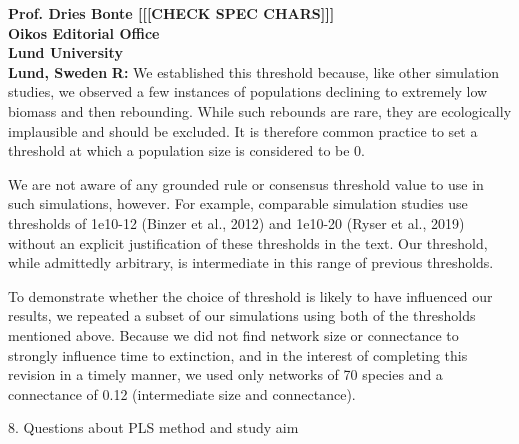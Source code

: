 \documentclass[12pt]{letter}
\begin{document}
\begin{letter}{\bf Prof. Dries Bonte [[[CHECK SPEC CHARS]]]\\
Oikos Editorial Office \\
Lund University \\
Lund, Sweden}
      \textbf{R:} We established this threshold because, like other simulation studies, we observed a few instances of populations declining to extremely low biomass and then rebounding. While such rebounds are rare, they are ecologically implausible and should be excluded. It is therefore common practice to set a threshold at which a population size is considered to be 0.
      
      
      We are not aware of any grounded rule or consensus threshold value to use in such simulations, however. For example, comparable simulation studies use thresholds of 1e10-12 (Binzer et al., 2012) and 1e10-20 (Ryser et al., 2019) without an explicit justification of these thresholds in the text. Our threshold, while admittedly arbitrary, is intermediate in this range of previous thresholds.
      
      
      To demonstrate whether the choice of threshold is likely to have influenced our results, we repeated a subset of our simulations using both of the thresholds mentioned above. Because we did not find network size or connectance to strongly influence time to extinction, and in the interest of completing this revision in a timely manner, we used only networks of 70 species and a connectance of 0.12 (intermediate size and connectance).



    8. Questions about PLS method and study aim


\end{letter}
\end{document}
